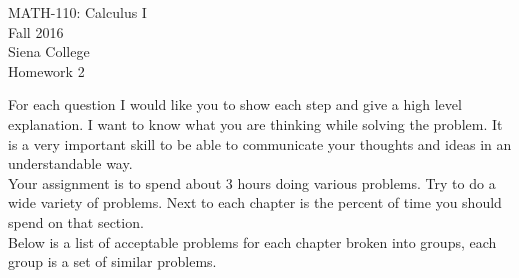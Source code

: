 \documentclass[11pt]{article}
\begin{document}
	\begin{center}
		MATH-110: Calculus I\\
		Fall 2016\\
		Siena College\\
		\vspace{.1in}
		Homework 2
	\end{center}
	
	For each question I would like you to show each step and give a high level explanation.  I want to know what you are thinking while solving the problem.  It is a very important skill to be able to communicate your thoughts and ideas in an understandable way.\\
	
	Your assignment is to spend about 3 hours doing various problems.  Try to do a wide variety of problems.  Next to each chapter is the percent of time you should spend on that section.\\
	
	Below is a list of acceptable problems for each chapter broken into groups, each group is a set of similar problems.
	
\end{document}
